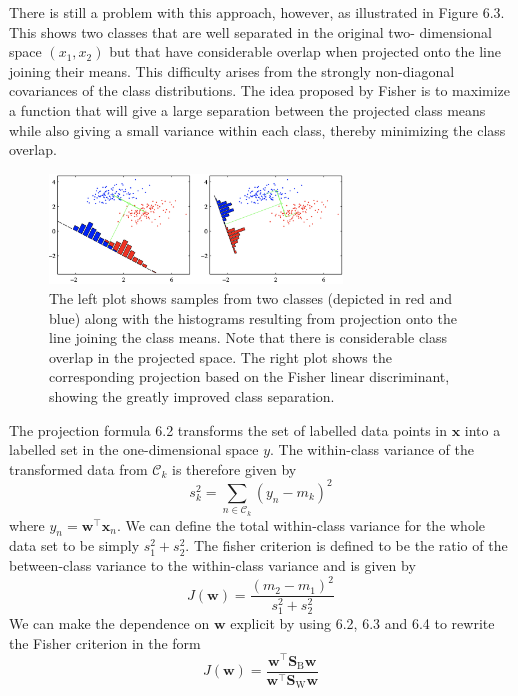 \documentclass[twoside]{article}
\begin{document}
There is still a problem with this approach, however, as illustrated in Figure 6.3. This shows two classes that are well separated in the original two- dimensional space $(x_1, x_2)$ but that have considerable overlap when projected onto the line joining their means. This difficulty arises from the strongly non-diagonal covariances of the class distributions. The idea proposed by Fisher is to maximize a function that will give a large separation between the projected class means while also giving a small variance within each class, thereby minimizing the class overlap.
\newpage
\begin{figure}[h]
    \centering
    \includegraphics[width=0.70\textwidth]{img/fisher.png}
    \caption{The left plot shows samples from two classes (depicted in red and blue) along with the histograms resulting from projection onto the line joining the class means. Note that there is considerable class overlap in the projected space. The right plot shows the corresponding projection based on the Fisher linear discriminant, showing the greatly improved class separation.}
\end{figure}
The projection formula 6.2 transforms the set of labelled data points in $\boldsymbol{x}$ into a labelled set in the one-dimensional space $y$. The within-class variance of the transformed data from $\mathcal{C}_k$ is therefore given by
\begin{equation}
    s_k^2 = \sum\limits_{n \in \mathcal{C}_k}(y_n - m_k)^2
\end{equation}
where $y_n = \boldsymbol{w^\intercal x}_n$. We can define the total within-class variance for the whole data set to be simply $s_1^2 + s_2^2$. The fisher criterion is defined to be the ratio of the between-class variance to the within-class variance and is given by
\begin{equation*}
    J(\boldsymbol{w}) = \frac{(m_2 - m_1)^2}{s_1^2 + s_2^2}
\end{equation*}
We can make the dependence on $\boldsymbol{w}$ explicit by using 6.2, 6.3 and 6.4 to rewrite the Fisher criterion in the form
\begin{equation}
    J(\boldsymbol{w}) = \frac{\boldsymbol{w}^\intercal\textbf{S}_\text{B}\boldsymbol{w}}{\boldsymbol{w}^\intercal\textbf{S}_\text{W}\boldsymbol{w}}
\end{equation}
\end{document}
